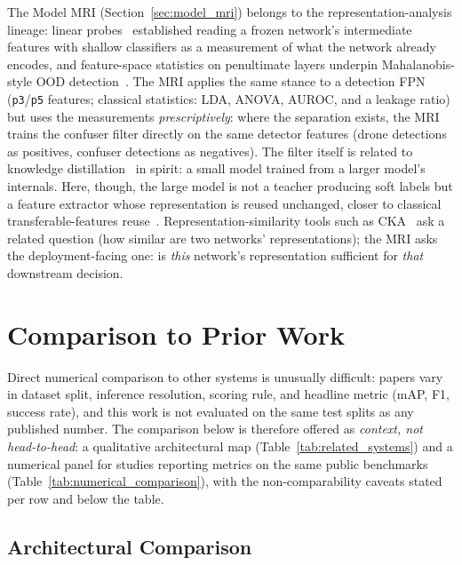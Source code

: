The Model MRI (Section~\ref{sec:model_mri}) belongs to the representation-analysis lineage: linear probes~\cite{alain2016understanding} established reading a frozen network's intermediate features with shallow classifiers as a measurement of what the network already encodes, and feature-space statistics on penultimate layers underpin Mahalanobis-style OOD detection~\cite{lee2018simple}. The MRI applies the same stance to a detection FPN (\texttt{p3}/\texttt{p5} features; classical statistics: LDA, ANOVA, AUROC, and a leakage ratio) but uses the measurements \emph{prescriptively}: where the separation exists, the MRI trains the confuser filter directly on the same detector features (drone detections as positives, confuser detections as negatives). The filter itself is related to knowledge distillation~\cite{hinton2015distilling} in spirit: a small model trained from a larger model's internals. Here, though, the large model is not a teacher producing soft labels but a feature extractor whose representation is reused unchanged, closer to classical transferable-features reuse~\cite{yosinski2014transferable}. Representation-similarity tools such as CKA~\cite{kornblith2019similarity} ask a related question (how similar are two networks' representations); the MRI asks the deployment-facing one: is \emph{this} network's representation sufficient for \emph{that} downstream decision.

\section{Comparison to Prior Work}
\label{sec:comparison}

Direct numerical comparison to other systems is unusually difficult: papers vary in dataset split, inference resolution, scoring rule, and headline metric (mAP, F1, success rate), and this work is not evaluated on the same test splits as any published number. The comparison below is therefore offered as \emph{context, not head-to-head}: a qualitative architectural map (Table~\ref{tab:related_systems}) and a numerical panel for studies reporting metrics on the same public benchmarks (Table~\ref{tab:numerical_comparison}), with the non-comparability caveats stated per row and below the table.

\subsection{Architectural Comparison}

